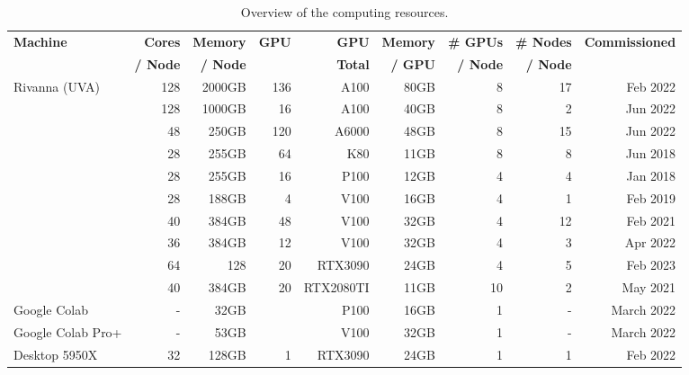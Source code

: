 \documentclass[sigplan,screen,noacm]{acmart}
\begin{document}
\begin{table}[htb]
    \caption{Overview of the computing resources.}
    \label{tab:hwoverview}
    \begin{center}
    {\footnotesize
    \begin{tabular}{|l|r|r|r|r|r|r|r|r|}
        \hline
            {\bf Machine}  & {\bf Cores} & {\bf Memory} & {\bf GPU} & {\bf GPU}   &   {\bf Memory} & {\bf \# GPUs} & {\bf \# Nodes}  & {\bf Commissioned} \\ 
                     &  {\bf / Node} & {\bf / Node}  &  & {\bf Total} & {\bf / GPU} & {\bf / Node}     &   {\bf / Node}        &  \\
        \hline
        \hline
        Rivanna (UVA)    & 128 & 2000GB   & 136 & A100 & 80GB &  8  & 17 & Feb 2022 \\
                        & 128 & 1000GB   & 16 & A100 & 40GB &  8  &  2 & Jun 2022  \\  & 48 & 250GB   & 120 & A6000 & 48GB &  8  &  15 & Jun 2022  \\   
                        & 28  & 255GB    & 64 & K80  & 11GB &  8  &  8 & Jun 2018         \\
                        & 28  & 255GB    & 16 & P100 & 12GB &  4  &  4 & Jan 2018         \\
                        & 28  & 188GB    & 4 & V100 & 16GB &  4  &  1 & Feb 2019          \\
                        & 40  & 384GB    & 48 & V100 & 32GB &  4  & 12 & Feb 2021          \\
                        & 36  & 384GB    & 12 & V100 & 32GB &  4  &  3 & Apr 2022          \\
                        &  64 & 128     & 20 & RTX3090   & 24GB    & 4   &  5 & Feb 2023         \\
                        & 40  & 384GB    & 20 & RTX2080TI & 11GB & 10  &  2 & May 2021 \\                        
         \hline
         Google Colab      & -   & 32GB      & & P100      & 16GB    & 1 & - & March 2022 \\
         Google Colab Pro+ & -   & 53GB      & & V100      & 32GB    & 1 & - & March 2022 \\
         \hline
         Desktop 5950X     &  32 & 128GB     & 1& RTX3090   & 24GB    & 1 & 1 & Feb 2022   \\
         \hline
    \end{tabular}
    }
    \end{center}
\end{table}
\end{document}
